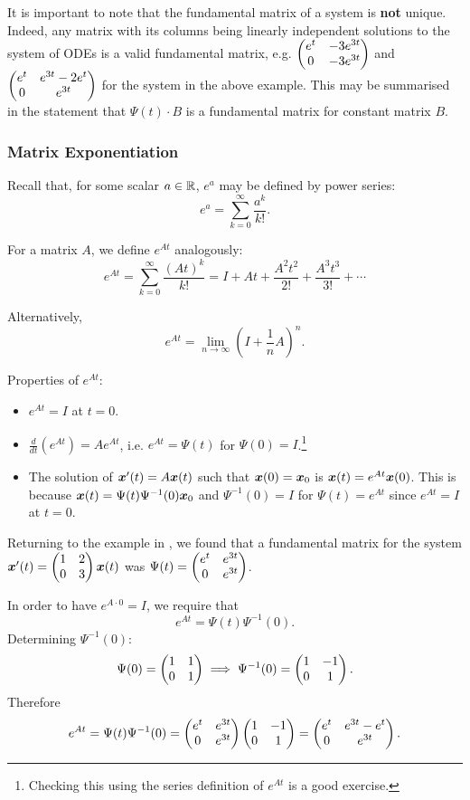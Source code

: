 It is important to note that the fundamental matrix of a system is \textbf{not} unique. Indeed, any matrix with its columns being linearly independent solutions to the system of ODEs is a valid fundamental matrix, e.g. $\begin{pmatrix}e^t & -3e^{3t} \\ 0 & -3e^{3t}\end{pmatrix}$ and $\begin{pmatrix}e^t & e^{3t}-2e^t \\ 0 & e^{3t}\end{pmatrix}$ for the system in the above example. This may be summarised in the statement that $\Psi(t) \cdot B$ is a fundamental matrix for constant matrix $B$.

\subsubsection{Matrix Exponentiation}

Recall that, for some scalar $a \in \mathbb{R}$, $e^a$ may be defined by power series:
\[
e^a = \sum_{k=0}^{\infty} \frac{a^k}{k!}.
\]

For a matrix $A$, we define $e^{At}$ analogously:
\[
e^{At} = \sum_{k=0}^{\infty} \frac{(At)^k}{k!} = I + At + \frac{A^2t^2}{2!} + \frac{A^3t^3}{3!} + \cdots
\]

Alternatively,
\[
	e^{At} = \lim_{n\to\infty} \left(I + \frac{1}{n}A\right)^n.
\]

Properties of $e^{At}$:
\begin{itemize}
	\item $e^{At} = I$ at $t=0$.
	\item $\frac{d}{dt}(e^{At}) = A e^{At}$, i.e. $e^{At} = \Psi(t)$ for $\Psi(0) = I$.\footnote{Checking this using the series definition of $e^{At}$ is a good exercise.}
	\item The solution of $\bm{x}'(t) = A\bm{x}(t)$ such that $\bm{x}(0) = \bm{x}_0$ is $\bm{x}(t) = e^{At} \bm{x}(0)$. This is because $\bm{x}(t) = \Psi(t) \Psi^{-1}(0) \bm{x}_0$ and $\Psi^{-1}(0) = I$ for $\Psi(t) = e^{At}$ since $e^{At} = I$ at $t=0$.
\end{itemize}

\begin{eg}
	Returning to the example in , we found that a fundamental matrix for the system $\bm{x}'(t) = \begin{pmatrix}1 & 2 \\ 0 & 3\end{pmatrix} \bm{x}(t)$ was $\Psi(t) = \begin{pmatrix}e^t & e^{3t} \\ 0 & e^{3t}\end{pmatrix}$.
	
	In order to have $e^{A\cdot 0} = I$, we require that
	\[
	e^{At} = \Psi(t) \Psi^{-1}(0).
	\]
	Determining $\Psi^{-1}(0)$:
	\[
	\Psi(0) = \begin{pmatrix}1 & 1 \\ 0 & 1\end{pmatrix} \implies \Psi^{-1}(0) = \begin{pmatrix}1 & -1 \\ 0 & 1\end{pmatrix}.
	\]
	Therefore
	\[
	e^{At} = \Psi(t) \Psi^{-1}(0) = \begin{pmatrix}e^t & e^{3t} \\ 0 & e^{3t}\end{pmatrix} \begin{pmatrix}1 & -1 \\ 0 & 1\end{pmatrix} = \begin{pmatrix}e^t & e^{3t}-e^t \\ 0 & e^{3t}\end{pmatrix}.
	\]
\end{eg}

